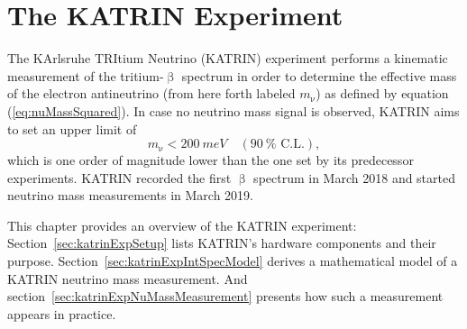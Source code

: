 \chapter{The KATRIN Experiment}
\label{sec:katrin}
The KArlsruhe TRItium Neutrino (KATRIN) experiment performs a kinematic measurement of the tritium-$\upbeta$ spectrum in order to determine the effective mass of the electron antineutrino (from here forth labeled $m_\upnu$) as defined by equation (\ref{eq:nuMassSquared}). In case no neutrino mass signal is observed, KATRIN aims to set an upper limit of
\begin{equation*}
m_\upnu < \SI{200}{meV} \quad (\SI{90}{\percent} \text{ C.L.})
\comma
\end{equation*}
which is one order of magnitude lower than the one set by its predecessor experiments.
KATRIN recorded the first $\upbeta$ spectrum in March 2018 and started neutrino mass measurements in March 2019.

This chapter provides an overview of the KATRIN experiment: Section~\ref{sec:katrinExpSetup} lists KATRIN's hardware components and their purpose. Section~\ref{sec:katrinExpIntSpecModel} derives a mathematical model of a KATRIN neutrino mass measurement. And section~\ref{sec:katrinExpNuMassMeasurement} presents how such a measurement appears in practice.



